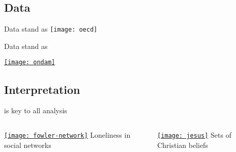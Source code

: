 \documentclass[t]{beamer}
\begin{document}
  \subsection{Data}
  
  \begin{frame}[t]{Data stand as }
    \texttt{[image: oecd]}
  \end{frame}
  
  \begin{frame}[c]{Data stand as }

    \begin{center}
      \href{http://www.securite-sociale.fr/chiffres/ccss/notesconj/conj200903.pdf}{\texttt{[image: ondam]}}
    \end{center}    

  \end{frame}
  
  \subsection{Interpretation}
  
  \begin{frame}[c]{ is key to all analysis}

    \begin{columns}[T]
      

      \begin{center}
        \href{http://jhfowler.ucsd.edu/alone_in_the_crowd.pdf}{\texttt{[image: fowler-network]}}\vspace{1cm}
        Loneliness in social networks
      \end{center}
      

      \begin{center}
        \href{http://books.google.fr/books?id=gvgCYyFN7RIC&pg=PA19&lpg=PA19}{\texttt{[image: jesus]}}\vspace{1.05cm}
        Sets of Christian beliefs
      \end{center}
      
    \end{columns}

  \end{frame}
  
\end{document}
